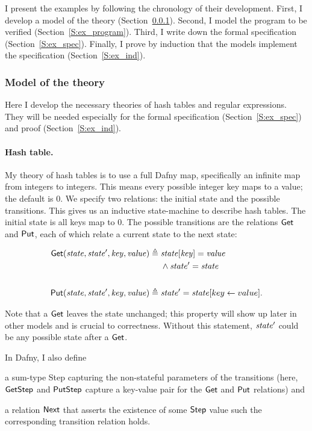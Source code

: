 I present the examples by following the chronology of their development. First,
I develop a model of the theory (Section~\ref{S:ex_theory}). Second, I model the
program to be verified (Section~\ref{S:ex_program}). Third, I write down the
formal specification (Section~\ref{S:ex_spec}). Finally, I prove by induction
that the models implement the specification (Section~\ref{S:ex_ind}).

\subsubsection{Model of the theory}\label{S:ex_theory}

Here I develop the necessary theories of hash tables and regular expressions.
They will be needed especially for the formal specification
(Section~\ref{S:ex_spec}) and proof (Section~\ref{S:ex_ind}).

\paragraph{Hash table.} My theory of hash tables is to use a full Dafny map,
specifically an infinite map from integers to integers. This means every
possible integer key maps to a value; the default is 0. We specify two
relations: the initial state and the possible transitions. This gives us an
inductive state-machine to describe hash tables. The initial state is all keys
map to 0. The possible transitions are the relations \(\mathsf{Get}\) and
\(\mathsf{Put}\), each of which relate a current state to the next state:

\begin{align*}
    \mathsf{Get}(\mathit{state}, \mathit{state'}, \mathit{key}, \mathit{value}) \triangleq\;&
    \mathit{state}[\mathit{key}] = \mathit{value} \\
    & \land \mathit{state'} = \mathit{state} \\
    \\
    \mathsf{Put}(\mathit{state}, \mathit{state'}, \mathit{key}, \mathit{value}) \triangleq\;&
    \mathit{state'} = \mathit{state}[key \gets value].
\end{align*}

Note that a \(\mathsf{Get}\) leaves the state unchanged; this property will show
up later in other models and is crucial to correctness. Without this statement,
\(\mathit{state'}\) could be any possible state after a \(\mathsf{Get}\).

In Dafny, I also define
\begin{inlist}
\item a sum-type Step capturing the non-stateful parameters of the transitions
    (here, \(\mathsf{GetStep}\) and \(\mathsf{PutStep}\) capture a key-value pair
    for the \(\mathsf{Get}\) and \(\mathsf{Put}\) relations) and
\item a relation \(\mathsf{Next}\) that asserts the existence of some
    \(\mathsf{Step}\) value such the corresponding transition relation holds.
\end{inlist}

